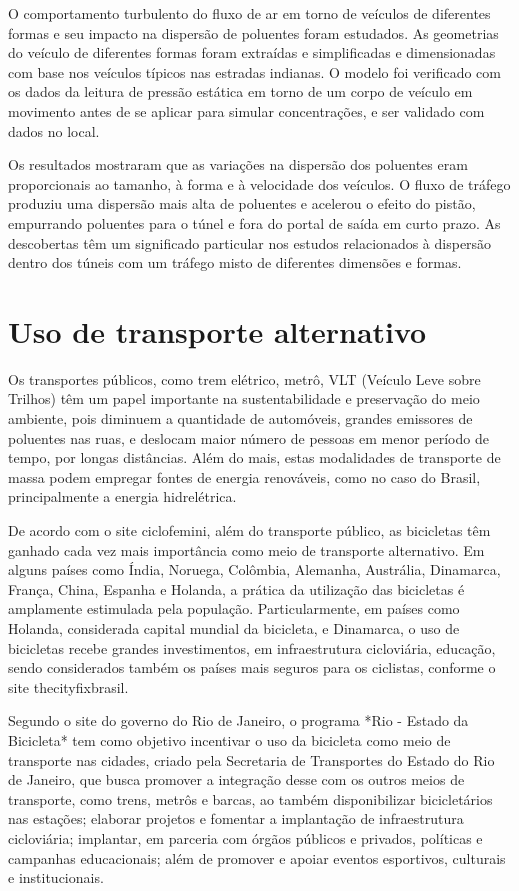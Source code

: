 O comportamento turbulento do fluxo de ar em torno de veículos de diferentes formas e seu impacto na 
dispersão de poluentes foram estudados. As geometrias do veículo de diferentes formas foram extraídas 
e simplificadas e dimensionadas com base nos veículos típicos nas estradas indianas. O modelo foi 
verificado com os dados da leitura de pressão estática em torno de um corpo de veículo em movimento 
antes de se aplicar para simular concentrações, e ser validado com dados no local.

Os resultados mostraram que as variações na dispersão dos poluentes eram proporcionais ao tamanho, à 
forma e à velocidade dos veículos. O fluxo de tráfego produziu uma dispersão mais alta de poluentes 
e acelerou o efeito do pistão, empurrando poluentes para o túnel e fora do portal de saída em curto 
prazo. As descobertas têm um significado particular nos estudos relacionados à dispersão dentro dos 
túneis com um tráfego misto de diferentes dimensões e formas.

\section{Uso de transporte alternativo}

Os transportes públicos, como trem elétrico, metrô, VLT (Veículo Leve sobre Trilhos) têm um papel 
importante na sustentabilidade e preservação do meio ambiente, pois diminuem a quantidade de 
automóveis, grandes emissores de poluentes nas ruas, e deslocam maior número de pessoas em menor 
período de tempo, por longas distâncias. Além do mais, estas modalidades de transporte de massa podem 
empregar fontes de energia renováveis, como no caso do Brasil, principalmente a energia hidrelétrica. 

De acordo com o site ciclofemini, além do transporte público, as bicicletas têm ganhado cada vez mais 
importância  como meio de transporte alternativo. Em alguns países como Índia, Noruega, Colômbia, 
Alemanha, Austrália, Dinamarca, França, China, Espanha e Holanda, a prática da utilização das bicicletas 
é amplamente estimulada pela população. Particularmente, em países como Holanda, considerada capital 
mundial da bicicleta, e Dinamarca, o uso de bicicletas recebe grandes investimentos, em infraestrutura 
cicloviária, educação, sendo considerados também os países mais seguros para os ciclistas, conforme o 
site thecityfixbrasil.

Segundo o site do governo do Rio de Janeiro, o programa *Rio - Estado da Bicicleta* tem como objetivo 
incentivar o uso da bicicleta como meio de transporte nas cidades, criado pela Secretaria de Transportes 
do Estado do Rio de Janeiro, que busca promover a integração desse com os outros meios de transporte, 
como trens, metrôs e barcas, ao também disponibilizar bicicletários nas estações; elaborar projetos e 
fomentar a implantação de infraestrutura cicloviária; implantar, em parceria com órgãos públicos e 
privados, políticas e campanhas educacionais; além de promover e apoiar eventos esportivos, culturais e 
institucionais.

